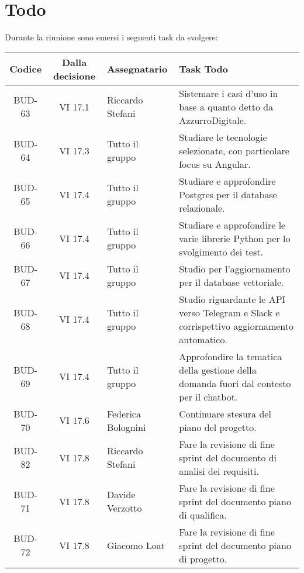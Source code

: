 
\section{Todo}

Durante la riunione sono emersi i seguenti task da svolgere:

\vspace{0.5cm}

\begin{table}[htbp]
\centering
{}
\begin{tabular}{|c|c|p{}|p{}|}
    \hline
    \rowcolor[gray]{0.75}
    \textbf{Codice} & \textbf{Dalla decisione} & \textbf{Assegnatario} & \textbf{Task Todo} \\
    \hline
    BUD-63 & VI 17.1 & Riccardo Stefani & Sistemare i casi d'uso in base a quanto detto da AzzurroDigitale. \\
    \hline
    BUD-64 & VI 17.3 & Tutto il gruppo & Studiare le tecnologie selezionate, con particolare focus su Angular. \\
    \hline
    BUD-65 & VI 17.4 & Tutto il gruppo & Studiare e approfondire Postgres per il database relazionale. \\
    \hline
    BUD-66 & VI 17.4 & Tutto il gruppo & Studiare e approfondire le varie librerie Python per lo svolgimento dei test. \\
    \hline
    BUD-67 & VI 17.4 & Tutto il gruppo & Studio per l'aggiornamento per il database vettoriale. \\
    \hline
    BUD-68 & VI 17.4 & Tutto il gruppo & Studio riguardante le API verso Telegram e Slack e corrispettivo aggiornamento automatico. \\
    \hline
    BUD-69 & VI 17.4 & Tutto il gruppo & Approfondire la tematica della gestione della domanda fuori dal contesto per il chatbot. \\
    \hline
    BUD-70 & VI 17.6 & Federica Bolognini & Continuare stesura del piano del progetto. \\
    \hline
    BUD-82 & VI 17.8 & Riccardo Stefani & Fare la revisione di fine sprint del documento di analisi dei requisiti. \\
    \hline
    BUD-71 & VI 17.8 & Davide Verzotto & Fare la revisione di fine sprint del documento piano di qualifica. \\
    \hline
    BUD-72 & VI 17.8 & Giacomo Loat & Fare la revisione di fine sprint del documento piano di progetto. \\

\end{tabular}
\end{table}
